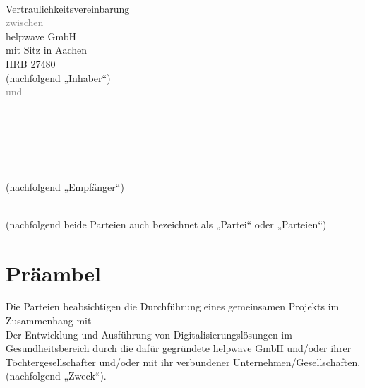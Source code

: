 \documentclass[10pt]{article}
\begin{document}
\begin{center}
    \\[4ex]
    {\Huge \sffamily Vertraulichkeitsvereinbarung}\\[2ex] 
    \textcolor{gray}{{\large \sffamily zwischen}}\\[2ex] 
    {\small 
helpwave GmbH \\
mit Sitz in Aachen \\
HRB 27480 \\
(nachfolgend „Inhaber“)
}\\[2ex]
   {\textcolor{gray}{{\large \sffamily und}}}\\[2ex] 
    {\small 
    
\begin{Form}
    \TextField[width=8cm, value={Name}, align=1]{} \\
    
    \vspace{0.2cm}
    
    \TextField[width=4cm, value={Adresse}, align=2]{} 
    \hspace{0.1cm}
    \TextField[width=2cm, value={Hausnr.}, align=0]{} \\
    
    \vspace{0.2cm}
    
    \TextField[width=2cm, value={PLZ}, align=2]{}
    \hspace{0.1cm}
    \TextField[width=3cm, value={Ort}, align=0]{} \\
\end{Form}
(nachfolgend „Empfänger“)}\\[2ex]
{\small
(nachfolgend beide Parteien auch bezeichnet als „Partei“ oder „Parteien“)
}
\end{center}

\vspace{2ex}

\tableofcontents

\newpage

\section*{Präambel}
Die Parteien beabsichtigen die Durchführung eines gemeinsamen Projekts im Zusammenhang mit \\

Der Entwicklung und Ausführung von Digitalisierungslösungen im Gesundheitsbereich durch die dafür gegründete helpwave GmbH und/oder ihrer Töchtergesellschafter und/oder mit ihr verbundener Unternehmen/Gesellschaften. 
(nachfolgend „Zweck“). \\
\end{document}
